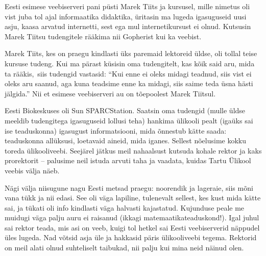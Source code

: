 Eesti esimese veebiserveri pani püsti Marek Tiits
ja kursusel, mille nimetus oli vist juba tol ajal informaatika
didaktika, üritasin ma lugeda igasuguseid uusi asju, kaasa arvatud internetti, sest ega mul internetikursust ei olnud.
Kutsusin Marek Tiitsu tudengitele rääkima nii Gopherist kui
ka veebist.

Marek Tiits, kes on praegu kindlasti üks paremaid
lektoreid üldse, oli tollal teise kursuse tudeng. Kui ma pärast küsisin oma
tudengitelt, kas kõik said aru, mida ta
rääkis, siis tudengid vastasid: \enquote{Kui enne ei oleks midagi
teadnud, siis vist ei oleks aru saanud, aga kuna teadsime enne ka midagi,
siis saime teda üsna hästi jälgida.} Nii et esimese veebiserveri au on tõepoolest
Marek Tiitsul.

Eesti Biokeskuses oli Sun SPARCStation.
Saatsin oma tudengid (mulle üldse meeldib tudengitega igasuguseid
lollusi teha) hankima ülikooli pealt (igaüks sai ise teaduskonna)
igasugust informatsiooni, mida õnnestub kätte saada: teaduskonna
allüksusi, loetavaid aineid, mida iganes. Sellest nõelusime kokku
toreda ülikooliveebi. Seejärel jätkus meil nahaalsust kutsuda kohale
rektor ja kaks prorektorit -- palusime neil istuda arvuti taha ja vaadata, kuidas
Tartu Ülikool veebis välja näeb.


Nägi välja niisugune nagu Eesti metsad praegu:
noorendik ja lageraie, siis mõni vana tükk ja nii edasi. See oli väga
lapiline, tulenevalt sellest, kes kust mida kätte sai, ja tükati oli info kindlasti väga halvasti kajastatud. Kujunduse peale me muidugi
väga palju auru ei raisanud (ikkagi matemaatikateaduskond!). Igal
juhul sai rektor teada, mis asi on veeb, kuigi tol hetkel sai Eesti veebiserverid
näppudel üles lugeda. Nad võtsid asja üle ja hakkasid päris ülikooliveebi tegema. Rektorid on meil
alati olnud suhteliselt taibukad, nii palju kui mina neid näinud olen.


